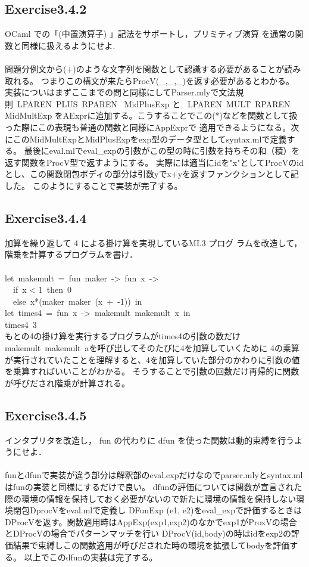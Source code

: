 \documentclass[a4paper,11pt,oneside,openany]{jsarticle}
\begin{document}
\subsection{Exercise3.4.2}
    OCaml での「(中置演算子) 」記法をサポートし，プリミティブ演算 を通常の関数と同様に扱えるようにせよ.\\\\
    問題分例文から(+)のような文字列を関数として認識する必要があることが読み取れる。
    つまりこの構文が来たらProcV(_,_,_)を返す必要があるとわかる。
    実装についはまずここまでの問と同様にしてParser.mlyで文法規則\ LPAREN\ PLUS\ RPAREN\  { MidPlusExp }と
    \ LPAREN\ MULT\ RPAREN\  { MidMultExp }をAExprに追加する。こうすることでこの(*)などを関数として扱った際にこの表現も普通の関数と同様にAppExprで
    適用できるようになる。次にこのMidMultExpとMidPlusExpをexp型のデータ型としてsyntax.mlで定義する。
    最後にeval.mlでeval_expの引数がこの型の時に引数を持ちその和（積）を返す関数をProcV型で返すようにする。
    実際には適当にidを"x"としてProcVのidとし、この関数閉包ボディの部分は引数yでx+yを返すファンクションとして記した。
    このようにすることで実装が完了する。

\subsection{Exercise3.4.4}
    加算を繰り返して 4 による掛け算を実現しているML3 プログ ラムを改造して，階乗を計算するプログラムを書け．\\\\
    let\ makemult\ =\ fun\ maker\ ->\ fun\ x\ ->\\ 
    \ \ if\ x < 1\ then\ 0 \\
    \ \ else\ x*(maker\ maker\ (x\ +\ -1))\ in\\ 
    let\ times4\ =\ fun\ x\ ->\ makemult\ makemult\ x\ in\\ 
    times4\ 3\\
    もとの4の掛け算を実行するプログラムがtimes4の引数の数だけmakemult\ makemult\ aを呼び出してそのたびに4を加算していくために
    4の乗算が実行されていたことを理解すると、4を加算していた部分のかわりに引数の値を乗算すればいいことがわかる。
    そうすることで引数の回数だけ再帰的に関数が呼びだされ階乗が計算される。

\subsection{Exercise3.4.5}
    インタプリタを改造し， fun の代わりに dfun を使った関数は動的束縛を行うようにせよ．\\\\
    funとdfunで実装が違う部分は解釈部のeval.expだけなのでparser.mlyとsyntax.mlはfunの実装と同様にするだけで良い。
    dfunの評価については関数が宣言された際の環境の情報を保持しておく必要がないので新たに環境の情報を保持しない環境閉包DprocVをeval.mlで定義し
    DFunExp (e1, e2)をeval_expで評価するときはDProcVを返す。関数適用時はAppExp(exp1,exp2)のなかでexp1がProxVの場合とDProcVの場合でパターンマッチを行い
    DProcV(id,body)の時はidをexp2の評価結果で束縛しこの関数適用が呼びだされた時の環境を拡張してbodyを評価する。
    以上でこのdfunの実装は完了する。
    
\end{document}
